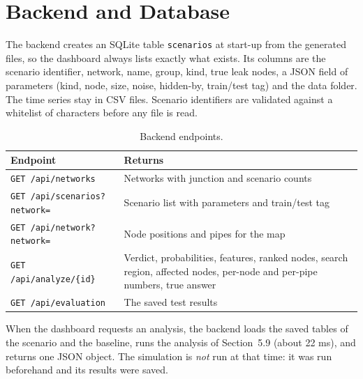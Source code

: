 \documentclass[11pt,letterpaper]{report}
\theoremstyle{definition}
\theoremstyle{plain}
\theoremstyle{remark}
\begin{document}
\section{Backend and Database}
The backend creates an SQLite table \texttt{scenarios} at start-up from the generated files, so the dashboard always lists exactly what exists. Its columns are the scenario identifier, network, name, group, kind, true leak nodes, a JSON field of parameters (kind, node, size, noise, hidden-by, train/test tag) and the data folder. The time series stay in CSV files. Scenario identifiers are validated against a whitelist of characters before any file is read.
\begin{table}[H]
\centering\small
\caption{Backend endpoints.}\label{tab:api}
\begin{tabularx}{\textwidth}{@{}p{2.0in}Y@{}}
\toprule
Endpoint & Returns \\
\midrule
\texttt{GET /api/networks} & Networks with junction and scenario counts \\
\texttt{GET /api/scenarios?network=} & Scenario list with parameters and train/test tag \\
\texttt{GET /api/network?network=} & Node positions and pipes for the map \\
\texttt{GET /api/analyze/\{id\}} & Verdict, probabilities, features, ranked nodes, search region, affected nodes, per-node and per-pipe numbers, true answer \\
\texttt{GET /api/evaluation} & The saved test results \\
\bottomrule
\end{tabularx}
\end{table}
When the dashboard requests an analysis, the backend loads the saved tables of the scenario and the baseline, runs the analysis of Section~5.9 (about 22 ms), and returns one JSON object. The simulation is \emph{not} run at that time: it was run beforehand and its results were saved.
\end{document}
